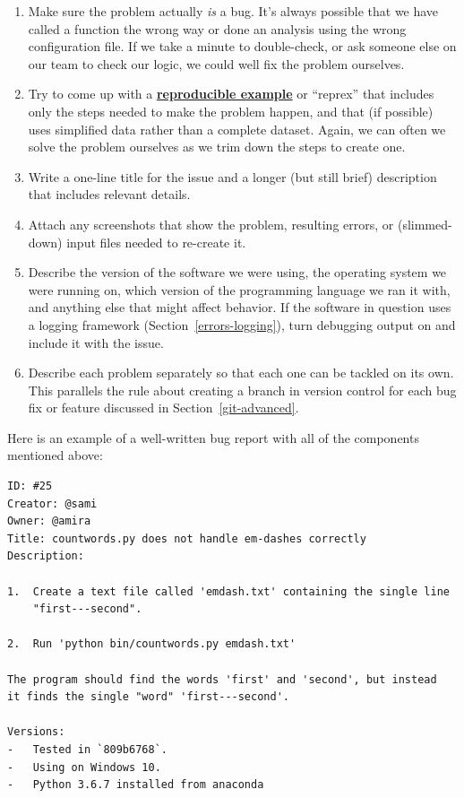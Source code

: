 \documentclass[
]{krantz}
\newcommand{\gref}[2]{\hyperlink{#2}{\textbf{#1}}}
\begin{document}
\begin{enumerate}
\def\labelenumi{\arabic{enumi}.}
\item
  Make sure the problem actually \emph{is} a bug.
  It's always possible that we have called a function the wrong way
  or done an analysis using the wrong configuration file.
  If we take a minute to double-check,
  or ask someone else on our team to check our logic,
  we could well fix the problem ourselves.
\item
  Try to come up with a \gref{reproducible example}{reprex}
  or ``reprex''
  that includes only the steps needed to make the problem happen,
  and that (if possible) uses simplified data rather than a complete dataset.
  Again,
  we can often we solve the problem ourselves as we trim down the steps to create one.
\item
  Write a one-line title for the issue
  and a longer (but still brief) description that includes relevant details.
\item
  Attach any screenshots that show the problem,
  resulting errors,
  or (slimmed-down) input files needed to re-create it.
\item
  Describe the version of the software we were using,
  the operating system we were running on,
  which version of the programming language we ran it with,
  and anything else that might affect behavior.
  If the software in question uses a logging framework (Section~\ref{errors-logging}),
  turn debugging output on and include it with the issue.
\item
  Describe each problem separately so that each one can be tackled on its own.
  This parallels the rule about creating a branch in version control for each bug fix or feature
  discussed in Section~\ref{git-advanced}.
\end{enumerate}

Here is an example of a well-written bug report with all of the components mentioned above:

\begin{verbatim}
ID: #25
Creator: @sami
Owner: @amira
Title: countwords.py does not handle em-dashes correctly
Description:

1.  Create a text file called 'emdash.txt' containing the single line
    "first---second".

2.  Run 'python bin/countwords.py emdash.txt'

The program should find the words 'first' and 'second', but instead
it finds the single "word" 'first---second'.

Versions:
-   Tested in `809b6768`.
-   Using on Windows 10.
-   Python 3.6.7 installed from anaconda
\end{verbatim}
\end{document}
